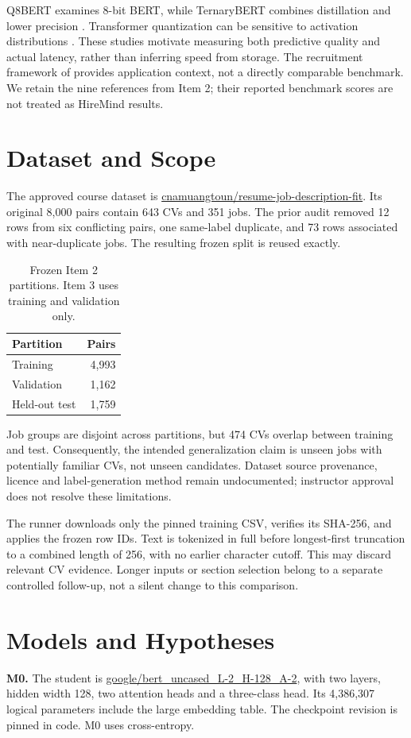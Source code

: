 \documentclass[11pt]{article}
\begin{document}
Q8BERT examines 8-bit BERT, while TernaryBERT combines distillation and lower precision \citep{q8,ternary}. Transformer quantization can be sensitive to activation distributions \citep{bondarenko}. These studies motivate measuring both predictive quality and actual latency, rather than inferring speed from storage. The recruitment framework of \citet{gan} provides application context, not a directly comparable benchmark. We retain the nine references from Item 2; their reported benchmark scores are not treated as HireMind results.

\section{Dataset and Scope}
The approved course dataset is \url{cnamuangtoun/resume-job-description-fit}. Its original 8,000 pairs contain 643 CVs and 351 jobs. The prior audit removed 12 rows from six conflicting pairs, one same-label duplicate, and 73 rows associated with near-duplicate jobs. The resulting frozen split is reused exactly.
\begin{table}[h]\centering\small
\begin{tabular}{lr}\toprule Partition & Pairs\\\midrule Training & 4,993\\Validation & 1,162\\Held-out test & 1,759\\\bottomrule\end{tabular}
\caption{Frozen Item 2 partitions. Item 3 uses training and validation only.}\end{table}
Job groups are disjoint across partitions, but 474 CVs overlap between training and test. Consequently, the intended generalization claim is unseen jobs with potentially familiar CVs, not unseen candidates. Dataset source provenance, licence and label-generation method remain undocumented; instructor approval does not resolve these limitations.

The runner downloads only the pinned training CSV, verifies its SHA-256, and applies the frozen row IDs. Text is tokenized in full before longest-first truncation to a combined length of 256, with no earlier character cutoff. This may discard relevant CV evidence. Longer inputs or section selection belong to a separate controlled follow-up, not a silent change to this comparison.

\section{Models and Hypotheses}
\textbf{M0.} The student is \url{google/bert_uncased_L-2_H-128_A-2}, with two layers, hidden width 128, two attention heads and a three-class head. Its 4,386,307 logical parameters include the large embedding table. The checkpoint revision is pinned in code. M0 uses cross-entropy.
\end{document}
